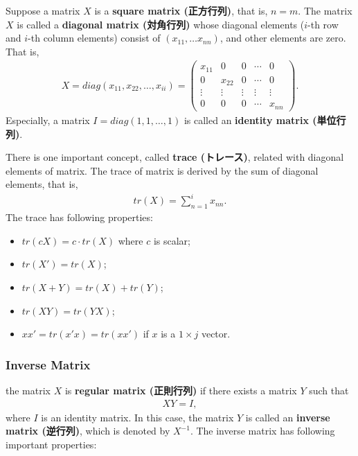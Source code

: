 \documentclass[
  12pt,
]{article}
\providecommand{\tightlist}{%
  \setlength{\itemsep}{0pt}\setlength{\parskip}{0pt}}
\begin{document}
Suppose a matrix \(X\) is a \textbf{square matrix (正方行列)}, that is,
\(n = m\). The matrix \(X\) is called a \textbf{diagonal matrix
(対角行列)} whose diagonal elements (\(i\)-th row and \(i\)-th column
elements) consist of \((x_{11}, \ldots x_{nn})\), and other elements are
zero. That is, \begin{align*}
  X 
  = diag(x_{11}, x_{22}, \ldots, x_{ii})
  =
  \begin{pmatrix}
    x_{11} & 0 & 0 & \cdots & 0 \\
    0 & x_{22} & 0 & \cdots & 0 \\
    \vdots & \vdots & \vdots & \vdots & \vdots \\
    0 & 0 & 0 & \cdots & x_{nn}
  \end{pmatrix}.
\end{align*} Especially, a matrix \(I = diag(1, 1, \ldots, 1)\) is
called an \textbf{identity matrix (単位行列)}.

There is one important concept, called \textbf{trace (トレース)},
related with diagonal elements of matrix. The trace of matrix is derived
by the sum of diagonal elements, that is, \begin{align*}
  tr(X) = \sum_{n = 1}^{i} x_{nn}.
\end{align*} The trace has following properties:

\begin{itemize}
\tightlist
\item
  \(tr(cX) = c \cdot tr(X)\) where \(c\) is scalar;
\item
  \(tr(X') = tr(X)\);
\item
  \(tr(X + Y) = tr(X) + tr(Y)\);
\item
  \(tr(XY) = tr(YX)\);
\item
  \(xx' = tr(x'x) = tr(x x')\) if \(x\) is a \(1 \times j\) vector.
\end{itemize}

\hypertarget{inverse-matrix}{%
\subsubsection{Inverse Matrix}\label{inverse-matrix}}

the matrix \(X\) is \textbf{regular matrix (正則行列)} if there exists a
matrix \(Y\) such that \begin{align*}
  X Y = I,
\end{align*} where \(I\) is an identity matrix. In this case, the matrix
\(Y\) is called an \textbf{inverse matrix (逆行列)}, which is denoted by
\(X^{-1}\). The inverse matrix has following important properties:
\end{document}
